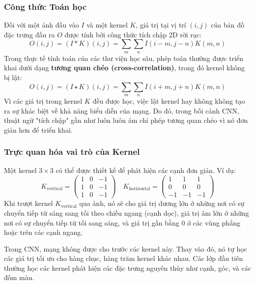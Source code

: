 \subsubsection{Công thức Toán học}
\label{subsubsec:conv_math_formula}
Đối với một ảnh đầu vào $I$ và một kernel $K$, giá trị tại vị trí $(i, j)$ của bản đồ đặc trưng đầu ra $O$ được tính bởi công thức tích chập 2D rời rạc:
\begin{equation}
	O(i, j) = (I * K)(i, j) = \sum_{m} \sum_{n} I(i-m, j-n) K(m, n)
	\label{eq:convolution_formula}
\end{equation}
Trong thực tế tính toán của các thư viện học sâu, phép toán thường được triển khai dưới dạng \textbf{tương quan chéo (cross-correlation)}, trong đó kernel không bị lật:
\begin{equation}
	O(i, j) = (I \star K)(i, j) = \sum_{m} \sum_{n} I(i+m, j+n) K(m, n)
	\label{eq:cross_correlation_formula}
\end{equation}
Vì các giá trị trong kernel $K$ đều được học, việc lật kernel hay không không tạo ra sự khác biệt về khả năng biểu diễn của mạng. Do đó, trong bối cảnh CNN, thuật ngữ "tích chập" gần như luôn luôn ám chỉ phép tương quan chéo vì nó đơn giản hơn để triển khai.

\subsubsection{Trực quan hóa vai trò của Kernel}
\label{subsubsec:conv_kernel_visualization}
Một kernel $3 \times 3$ có thể được thiết kế để phát hiện các cạnh đơn giản. Ví dụ:
\[
K_{\text{vertical}} = 
\begin{pmatrix}
	1 & 0 & -1 \\
	1 & 0 & -1 \\
	1 & 0 & -1
\end{pmatrix}
\quad
K_{\text{horizontal}} = 
\begin{pmatrix}
	1 & 1 & 1 \\
	0 & 0 & 0 \\
	-1 & -1 & -1
\end{pmatrix}
\]
Khi trượt kernel $K_{\text{vertical}}$ qua ảnh, nó sẽ cho giá trị dương lớn ở những nơi có sự chuyển tiếp từ sáng sang tối theo chiều ngang (cạnh dọc), giá trị âm lớn ở những nơi có sự chuyển tiếp từ tối sang sáng, và giá trị gần bằng 0 ở các vùng phẳng hoặc trên các cạnh ngang.

Trong CNN, mạng không được cho trước các kernel này. Thay vào đó, nó tự học các giá trị tối ưu cho hàng chục, hàng trăm kernel khác nhau. Các lớp đầu tiên thường học các kernel phát hiện các đặc trưng nguyên thủy như cạnh, góc, và các đốm màu.

